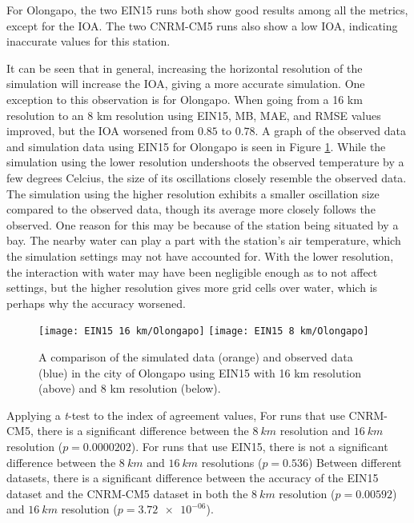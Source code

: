 	For Olongapo, the two EIN15 runs both show good results among all the metrics, except for the IOA.
	The two CNRM-CM5 runs also show a low IOA, indicating inaccurate values for this station.
	
	It can be seen that in general, increasing the horizontal resolution of the simulation will increase the IOA, giving a more accurate simulation.
	One exception to this observation is for Olongapo.
	When going from a 16 km resolution to an 8 km resolution using EIN15, MB, MAE, and RMSE values improved, but the IOA worsened from $0.85$ to $0.78$.
	A graph of the observed data and simulation data using EIN15 for Olongapo is seen in Figure \ref{fig:ein15-sim-vs-observed-olongapo}.
	While the simulation using the lower resolution undershoots the observed temperature by a few degrees Celcius, the size of its oscillations closely resemble the observed data.
	The simulation using the higher resolution exhibits a smaller oscillation size compared to the observed data, though its average more closely follows the observed.
	One reason for this may be because of the station being situated by a bay.
	The nearby water can play a part with the station’s air temperature, which the simulation settings may not have accounted for.
	With the lower resolution, the interaction with water may have been negligible enough as to not affect settings, but the higher resolution gives more grid cells over water, which is perhaps why the accuracy worsened.		
	
	\begin{figure}	
		\centering
		\texttt{[image: EIN15 16 km/Olongapo]}
		\texttt{[image: EIN15 8 km/Olongapo]}
		\caption{
			A comparison of the simulated data (orange) and observed data (blue) in the city of Olongapo using EIN15 with 16 km resolution (above) and 8 km resolution (below).
		}
		\label{fig:ein15-sim-vs-observed-olongapo}
	\end{figure}
	
	Applying a \textit{t}-test to the index of agreement values,
	For runs that use CNRM-CM5, there is a significant difference between the $\qty{8}{km}$ resolution and $\qty{16}{km}$ resolution ($p = \num{0.0000202}$).
	For runs that use EIN15, there is not a significant difference between the $\qty{8}{km}$ and $\qty{16}{km}$ resolutions ($p = \num{0.536}$)
	Between different datasets,	there is a significant difference between the accuracy of the EIN15 dataset and the CNRM-CM5 dataset in both the $\qty{8}{km}$ resolution ($p = \num{0.00592}$) and $\qty{16}{km}$ resolution ($p = \num{3.72e-06}$).
	
